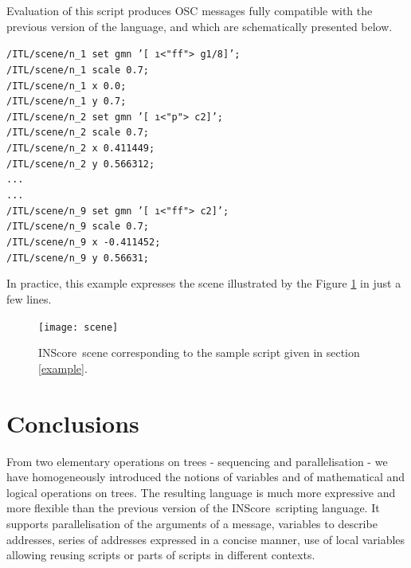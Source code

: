\documentclass{article}
\newcommand{\IS}		{INScore}
\newcommand{\code}	[2][0.9]		{\vspace{0mm}\begin{center}\colorbox{mygrey}{
							\begin{minipage}[t]{#1\columnwidth} 
							{\small \texttt{#2}}
							\end{minipage}}\end{center}}
\begin{document}
Evaluation of this script produces OSC messages fully compatible with the previous version of the language, and which are schematically presented below. 
\code[1]{/ITL/scene/n\_1 set gmn '[ \i<"ff"> g1/8]';\\
/ITL/scene/n\_1 scale 0.7;\\
/ITL/scene/n\_1 x 0.0;\\
/ITL/scene/n\_1 y 0.7;\\
/ITL/scene/n\_2 set gmn '[ \i<"p"> c2]';\\
/ITL/scene/n\_2 scale 0.7;\\
/ITL/scene/n\_2 x 0.411449;\\
/ITL/scene/n\_2 y 0.566312;\\
...\\
...\\
/ITL/scene/n\_9 set gmn '[ \i<"ff"> c2]';\\
/ITL/scene/n\_9 scale 0.7;\\
/ITL/scene/n\_9 x -0.411452;\\
/ITL/scene/n\_9 y 0.56631;
}

In practice, this example expresses the scene illustrated by the Figure \ref{samplescene} in just a few lines.  

\begin{figure}[htbp]
\begin{center}
\texttt{[image: scene]}
\caption{\IS\ scene corresponding to the sample script given in section \ref{example}.}
\label{samplescene}
\end{center}
\end{figure}


\section{Conclusions}
From two elementary operations on trees - sequencing and parallelisation - we have homogeneously introduced the notions of variables and of mathematical and logical operations on trees. The resulting language is much more expressive and more flexible than the  previous version of the \IS\ scripting language. 
It supports parallelisation of the arguments of a message, variables to describe addresses, series of addresses expressed in a concise manner, use of local variables allowing reusing scripts or parts of scripts in different contexts.



\balance

\end{document}

